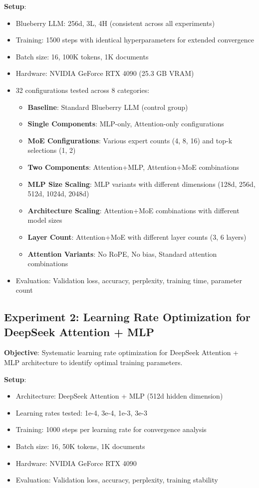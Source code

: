 \documentclass[11pt,a4paper]{article}
\begin{document}
\textbf{Setup}:
\begin{itemize}
    \item Blueberry LLM: 256d, 3L, 4H (consistent across all experiments)
    \item Training: 1500 steps with identical hyperparameters for extended convergence
    \item Batch size: 16, 100K tokens, 1K documents
    \item Hardware: NVIDIA GeForce RTX 4090 (25.3 GB VRAM)
    \item 32 configurations tested across 8 categories:
    \begin{itemize}
        \item \textbf{Baseline}: Standard Blueberry LLM (control group)
        \item \textbf{Single Components}: MLP-only, Attention-only configurations
        \item \textbf{MoE Configurations}: Various expert counts (4, 8, 16) and top-k selections (1, 2)
        \item \textbf{Two Components}: Attention+MLP, Attention+MoE combinations
        \item \textbf{MLP Size Scaling}: MLP variants with different dimensions (128d, 256d, 512d, 1024d, 2048d)
        \item \textbf{Architecture Scaling}: Attention+MoE combinations with different model sizes
        \item \textbf{Layer Count}: Attention+MoE with different layer counts (3, 6 layers)
        \item \textbf{Attention Variants}: No RoPE, No bias, Standard attention combinations
    \end{itemize}
    \item Evaluation: Validation loss, accuracy, perplexity, training time, parameter count
\end{itemize}

\subsection{Experiment 2: Learning Rate Optimization for DeepSeek Attention + MLP}

\textbf{Objective}: Systematic learning rate optimization for DeepSeek Attention + MLP architecture to identify optimal training parameters.

\textbf{Setup}:
\begin{itemize}
    \item Architecture: DeepSeek Attention + MLP (512d hidden dimension)
    \item Learning rates tested: 1e-4, 3e-4, 1e-3, 3e-3
    \item Training: 1000 steps per learning rate for convergence analysis
    \item Batch size: 16, 50K tokens, 1K documents
    \item Hardware: NVIDIA GeForce RTX 4090
    \item Evaluation: Validation loss, accuracy, perplexity, training stability
\end{itemize}
\end{document}
